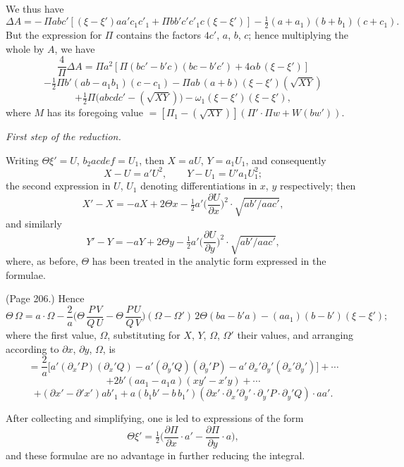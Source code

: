 \documentclass[11pt,a4paper]{article}
\theoremstyle{plain}
\theoremstyle{definition}
\newcommand{\Th}{\Theta} %
\begin{document}
We thus have
\[
\Delta A = -\,\Pi a b c' [(\xi - \xi') a a' c_1 c'_1 + \Pi b b' c' c'_1 c (\xi - \xi')] - \tfrac{1}{2}(a + a_1)(b + b_1) (c + c_1).
\]
But the expression for $\Pi$ contains the factors $4 c'$, $a$, $b$, $c$; hence multiplying the whole by $A$, we have
\[
\frac{4}{\Pi} \Delta A = \Pi a^2 [\Pi (b c' - b' c)(b c - b' c') + 4 \alpha b\,(\xi - \xi')]
\]
\[
- \tfrac{1}{2}\Pi b' (a b - a_1 b_1)(c - c_1) - \Pi a b\,(a + b) (\xi - \xi') (\sqrt{X Y})
\]
\[
+ \tfrac{1}{2}\Pi \big(abc d c' - (\sqrt{X Y})\big) - \omega_1 (\xi - \xi') (\xi - \xi'),
\]
where $M$ has its foregoing value $= [\Pi_1 - (\sqrt{X Y})] (\Pi' \cdot \Pi w + W (b w'))$.

\medskip

\noindent \emph{First step of the reduction.}

Writing $\Theta \xi' = U$, $b_2 a c d e f = U_1$, then $X = a U$, $Y = a_1 U_1$, and consequently
\[
X - U = a' U^2, \qquad Y - U_1 = U' a_1 U_1^2;
\]
the second expression in $U$, $U_1$ denoting differentiations in $x$, $y$ respectively; then
\[
X' - X = - a X + 2 \Theta x - \tfrac{1}{2} a' \big(\frac{\partial U}{\partial x}\big)^2 \cdot \sqrt{a b' / a a c'},
\]
and similarly
\[
Y' - Y = - a Y + 2 \Theta y - \tfrac{1}{2} a' \big(\frac{\partial U}{\partial y}\big)^2 \cdot \sqrt{a b' / a a c'},
\]
where, as before, $\Theta$ has been treated in the analytic form expressed in the formulae.

\medskip

\noindent (Page 206.) Hence
\[
\Th\,\Omega = a \cdot \Omega - \frac{2}{a}\Big(\Th\,\frac{P\,V}{Q\,U} - \Th\,\frac{P\,U}{Q\,V}\Big)(\Omega - \Omega')\,2\Theta(b a - b' a) - (a a_1)(b - b')(\xi - \xi');
\]
where the first value, $\Omega$, substituting for $X$, $Y$, $\Omega$, $\Omega'$ their values, and arranging according to $\partial x$, $\partial y$, $\Omega$, is
\[
= \frac{2}{a} \Big[ a' (\partial_x' P)(\partial_x' Q) - a' (\partial_y' Q)(\partial_y' P) - a'\,\partial_x' \partial_y' (\partial_x'\partial_y')\Big] + \cdots
\]
\[
+ 2 b' (a a_1 - a_1 a) (x y' - x' y) + \cdots
\]
\[
+ (\partial x' - \partial' x') a b'_1 + a (b_1 b' - b\,b_1') (\partial x' \cdot \partial_x' \partial_y' \cdot \partial_y' P \cdot \partial_y' Q) \cdot a a'.
\]
\medskip

After collecting and simplifying, one is led to expressions of the form
\[
\Theta \xi' = \tfrac{1}{2} \big(\frac{\partial \Pi}{\partial x} \cdot a' - \frac{\partial \Pi}{\partial y} \cdot a\big),
\]
and these formulae are no advantage in further reducing the integral.
\end{document}
